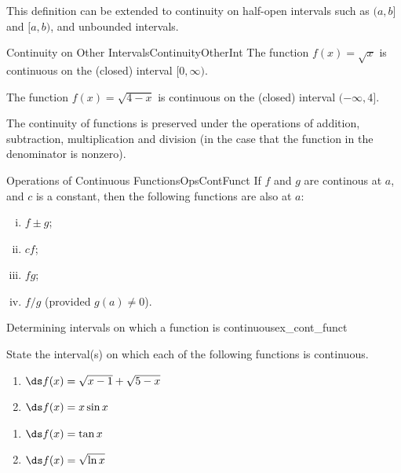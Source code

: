 This definition can be extended to continuity on half-open intervals such as $(a,b]$ and $[a,b)$, and unbounded intervals.

\begin{example}{Continuity on Other Intervals}{ContinuityOtherInt}
The function $f(x)=\sqrt{x}$ is continuous on the (closed) interval $[0,\infty)$.

\medskip
The function $f(x)=\sqrt{4-x}$ is continuous on the (closed) interval $(-\infty,4]$.
\end{example}

The continuity of functions is preserved under the operations of addition, subtraction, multiplication and division (in the case that the function in the denominator is nonzero).

\begin{theorem}{Operations of Continuous Functions}{OpsContFunct}
If $f$ and $g$ are continous at $a$, and $c$ is a constant, then the following functions are also  at $a$:
\begin{multicols}{2}
\begin{enumerate}[(i)]
\item $f\pm g$; 
\item $cf$; 
\item $fg$; 
\item $f/g$ (provided $g(a)\neq 0$).
\end{enumerate}
\end{multicols}
\end{theorem}

\begin{example}{Determining intervals on which a function is continuous}{ex_cont_funct}{
State the interval(s) on which each of the following functions is continuous.

		\noindent\begin{minipage}{.5\linewidth}
		\begin{enumerate}
		\item		$\ds f(x) = \sqrt{x-1} + \sqrt{5-x}$
		\item		$\ds f(x) = x\sin x$
		\end{enumerate}
		\end{minipage}
		\begin{minipage}{.5\linewidth}
		\begin{enumerate}\addtocounter{enumi}{2}
		\item		$\ds f(x) = \tan x$
		\item		$\ds f(x) = \sqrt{\ln x}$
		\end{enumerate}
		\end{minipage}
}
\end{example}



